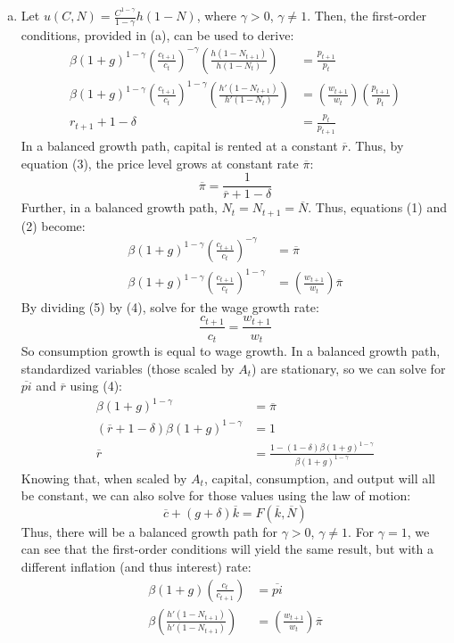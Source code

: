 \documentclass{article}
\begin{document}
\begin{enumerate}[(a)]
	\item Let $u(C,N) = \frac{C^{1-\gamma}}{1-\gamma}h(1-N)$, where $\gamma>0$, $\gamma\neq 1$. Then, the first-order conditions, provided in (a), can be used to derive:
		\begin{align}
			\beta(1+g)^{1-\gamma}\left(\frac{c_{t+1}}{c_t}\right)^{-\gamma}\left(\frac{h(1-N_{t+1})}{h(1-N_t)}\right) &= \frac{p_{t+1}}{p_t}	\\
			\beta(1+g)^{1-\gamma}\left(\frac{c_{t+1}}{c_t}\right)^{1-\gamma}\left(\frac{h'(1-N_{t+1})}{h'(1-N_t)}\right) &= \left(\frac{w_{t+1}}{w_t}\right)\left(\frac{p_{t+1}}{p_t}\right)	\\
			r_{t+1} + 1 - \delta &= \frac{p_t}{p_{t+1}}
		\end{align}
		In a balanced growth path, capital is rented at a constant $\overline{r}$. Thus, by equation (3), the price level grows at constant rate $\overline{\pi}$:
			\[
				\overline{\pi} = \frac{1}{\overline{r} + 1 - \delta}
			\]
		Further, in a balanced growth path, ${N_t=N_{t+1}=\overline{N}}$. Thus, equations (1) and (2) become:
		\begin{align}
			\beta(1+g)^{1-\gamma}\left(\frac{c_{t+1}}{c_t}\right)^{-\gamma} &= \overline{\pi}	\\
			\beta(1+g)^{1-\gamma}\left(\frac{c_{t+1}}{c_t}\right)^{1-\gamma} &= \left(\frac{w_{t+1}}{w_t}\right)\overline{\pi}
		\end{align}
		By dividing (5) by (4), solve for the wage growth rate:
		\[
			\frac{c_{t+1}}{c_t} = \frac{w_{t+1}}{w_t}
		\]
		So consumption growth is equal to wage growth. In a balanced growth path, standardized variables (those scaled by $A_t$) are stationary, so we can solve for $\overline{pi}$ and $\overline{r}$ using (4):
		\begin{align*}
			\beta(1+g)^{1-\gamma} &= \overline{\pi}	\\
			(\overline{r} + 1 - \delta)\beta(1+g)^{1-\gamma} &= 1	\\
			\overline{r} &= \frac{1 - (1-\delta)\beta(1+g)^{1-\gamma}}{\beta(1+g)^{1-\gamma}}
		\end{align*}
		Knowing that, when scaled by $A_t$, capital, consumption, and output will all be constant, we can also solve for those values using the law of motion:
		\[
			\overline{c} + (g+\delta)\overline{k} = F(\overline{k},\overline{N})
		\]
		Thus, there will be a balanced growth path for $\gamma >0$, $\gamma\neq 1$. For $\gamma=1$, we can see that the first-order conditions will yield the same result, but with a different inflation (and thus interest) rate:
		\begin{align*}
			\beta(1+g)\left(\frac{c_t}{c_{t+1}}\right) &= \overline{pi}	\\
			\beta\left(\frac{h'(1-N_{t+1})}{h'(1-N_{t+1})}\right) &= \left(\frac{w_{t+1}}{w_t}\right)\overline{\pi}
		\end{align*}
		

\end{enumerate}
\end{document}
